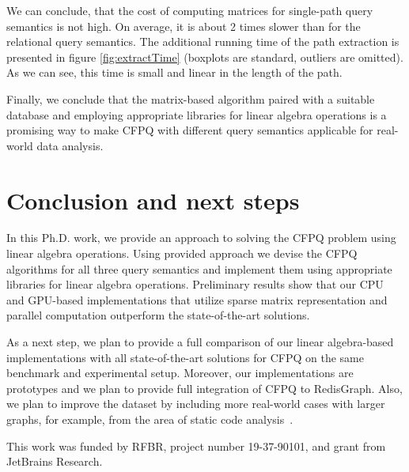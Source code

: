 \documentclass[sigconf, nonacm]{acmart}
\begin{document}
We can conclude, that the cost of computing matrices for single-path query semantics is not high. On average, it is about 2 times slower than for the relational query semantics. The additional running time of the path extraction is presented in figure \autoref{fig:extractTime} (boxplots are standard, outliers are omitted). As we can see, this time is small and linear in the length of the path.

Finally, we conclude that the matrix-based algorithm paired with a suitable database and employing appropriate libraries for linear algebra operations is a promising way to make CFPQ with different query semantics applicable for real-world data analysis.


\section{Conclusion and next steps}
In this Ph.D. work, we provide an approach to solving the CFPQ problem using linear algebra operations. Using provided approach we devise the CFPQ algorithms for all three query semantics and implement them using appropriate libraries for linear algebra operations. Preliminary results show that our CPU and GPU-based implementations that utilize sparse matrix representation and parallel computation outperform the state-of-the-art solutions.

As a next step, we plan to provide a full comparison of our linear algebra-based implementations with all state-of-the-art solutions for CFPQ on the same benchmark and experimental setup. Moreover, our implementations are prototypes and we
plan to provide full integration of CFPQ to RedisGraph. Also, we plan to improve the dataset by including more real-world cases with larger graphs, for example, from the area of static code analysis~\cite{Zheng, veduradabatch}.

\begin{acks}
	This work was funded by RFBR, project number
	19-37-90101, and grant from JetBrains Research.%
\end{acks}




\end{document}
